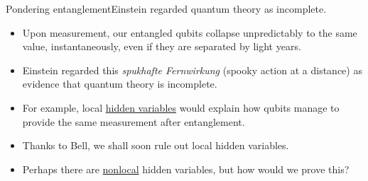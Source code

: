 \begin{frame}{Pondering entanglement}{Einstein regarded quantum theory as incomplete.}

\begin{itemize}
    \item<1-> Upon measurement, our entangled qubits collapse unpredictably to the same value, instantaneously, even if they are separated by light years.
    \item<2-> Einstein regarded this \textit{spukhafte Fernwirkung} (spooky action at a distance) as evidence that quantum theory is incomplete.
    \item<3-> For example, local \href{https://en.wikipedia.org/wiki/Hidden-variable_theory}{hidden variables} would explain how qubits manage to provide the same measurement after entanglement.
    \item<6-> Thanks to Bell, we shall soon rule out local hidden variables.
    \item<7-> Perhaps there are \href{https://en.wikipedia.org/wiki/Principle_of_locality}{nonlocal} hidden variables, but how would we prove this?
\end{itemize}
    
\end{frame}